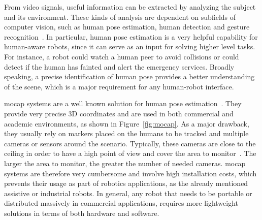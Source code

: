 From video signals, useful information can be extracted by analyzing the subject and its environment. These kinds of analysis are dependent on subfields of computer vision, such as human pose estimation, human detection and gesture recognition~\cite{leo2018deep}. In particular, human pose estimation is a very helpful capability for human-aware robots, since it can serve as an input for solving higher level tasks. For instance, a robot could watch a human peer to avoid collisions or could detect if the human has fainted and alert the emergency services. Broadly speaking, a precise identification of human pose provides a better understanding of the scene, which is a major requirement for any human-robot interface.

\gls{mocap} systems are a well known solution for human pose estimation~\cite{vicon_2020}. They provide very precise 3D coordinates and are used in both commercial and academic environments, as shown in Figure~\ref{fig:mocap}. As a major drawback, they usually rely on markers placed on the humans to be tracked and multiple cameras or sensors around the scenario. Typically, these cameras are close to the ceiling in order to have a high point of view and cover the area to monitor~\cite{leone2011detecting}. The larger the area to monitor, the greater the number of needed cameras. \gls{mocap} systems are therefore very cumbersome and involve high installation costs, which prevents their usage as part of robotics applications, as the already mentioned assistive or industrial robots. In general, any robot that needs to be portable or distributed massively in commercial applications, requires more lightweight solutions in terms of both hardware and software. 

